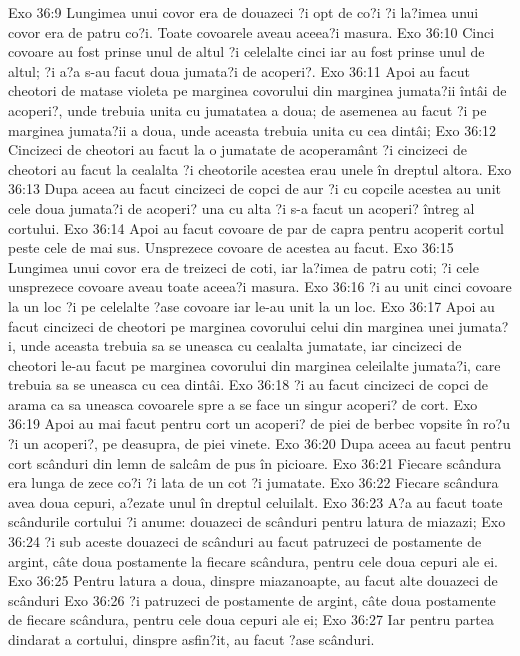Exo 36:9  Lungimea unui covor era de douazeci ?i opt de co?i ?i la?imea unui covor era de patru co?i. Toate covoarele aveau aceea?i masura.
Exo 36:10  Cinci covoare au fost prinse unul de altul ?i celelalte cinci iar au fost prinse unul de altul; ?i a?a s-au facut doua jumata?i de acoperi?.
Exo 36:11  Apoi au facut cheotori de matase violeta pe marginea covorului din marginea jumata?ii întâi de acoperi?, unde trebuia unita cu jumatatea a doua; de asemenea au facut ?i pe marginea jumata?ii a doua, unde aceasta trebuia unita cu cea dintâi;
Exo 36:12  Cincizeci de cheotori au facut la o jumatate de acoperamânt ?i cincizeci de cheotori au facut la cealalta ?i cheotorile acestea erau unele în dreptul altora.
Exo 36:13  Dupa aceea au facut cincizeci de copci de aur ?i cu copcile acestea au unit cele doua jumata?i de acoperi? una cu alta ?i s-a facut un acoperi? întreg al cortului.
Exo 36:14  Apoi au facut covoare de par de capra pentru acoperit cortul peste cele de mai sus. Unsprezece covoare de acestea au facut.
Exo 36:15  Lungimea unui covor era de treizeci de coti, iar la?imea de patru coti; ?i cele unsprezece covoare aveau toate aceea?i masura.
Exo 36:16  ?i au unit cinci covoare la un loc ?i pe celelalte ?ase covoare iar le-au unit la un loc.
Exo 36:17  Apoi au facut cincizeci de cheotori pe marginea covorului celui din marginea unei jumata?i, unde aceasta trebuia sa se uneasca cu cealalta jumatate, iar cincizeci de cheotori le-au facut pe marginea covorului din marginea celeilalte jumata?i, care trebuia sa se uneasca cu cea dintâi.
Exo 36:18  ?i au facut cincizeci de copci de arama ca sa uneasca covoarele spre a se face un singur acoperi? de cort.
Exo 36:19  Apoi au mai facut pentru cort un acoperi? de piei de berbec vopsite în ro?u ?i un acoperi?, pe deasupra, de piei vinete.
Exo 36:20  Dupa aceea au facut pentru cort scânduri din lemn de salcâm de pus în picioare.
Exo 36:21  Fiecare scândura era lunga de zece co?i ?i lata de un cot ?i jumatate.
Exo 36:22  Fiecare scândura avea doua cepuri, a?ezate unul în dreptul celuilalt.
Exo 36:23  A?a au facut toate scândurile cortului ?i anume: douazeci de scânduri pentru latura de miazazi;
Exo 36:24  ?i sub aceste douazeci de scânduri au facut patruzeci de postamente de argint, câte doua postamente la fiecare scândura, pentru cele doua cepuri ale ei.
Exo 36:25  Pentru latura a doua, dinspre miazanoapte, au facut alte douazeci de scânduri
Exo 36:26  ?i patruzeci de postamente de argint, câte doua postamente de fiecare scândura, pentru cele doua cepuri ale ei;
Exo 36:27  Iar pentru partea dindarat a cortului, dinspre asfin?it, au facut ?ase scânduri.
